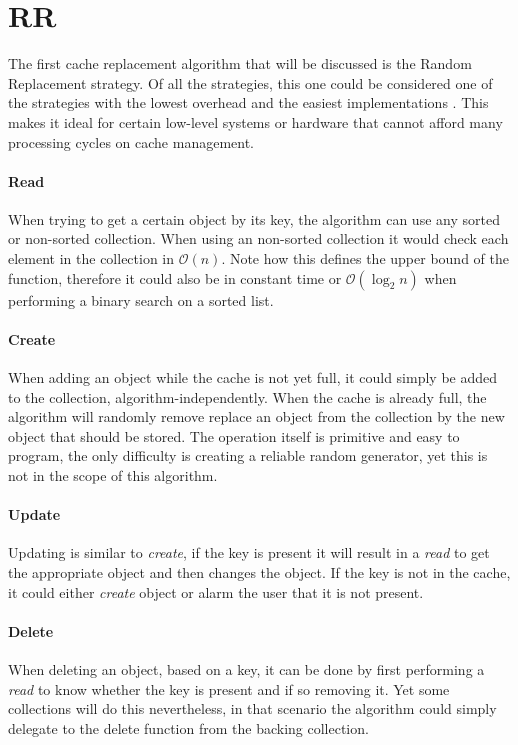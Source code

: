 \documentclass[pdftex,a4paper,12pt,twoside]{report}
\begin{document}
\section{RR}
The first cache replacement algorithm that will be discussed is the Random Replacement strategy. Of all the strategies, this one could be considered one of the strategies with the lowest overhead and the easiest implementations \citep{random_replacement}. This makes it ideal for certain low-level systems or hardware that cannot afford many processing cycles on cache management.
\paragraph{Read} When trying to get a certain object by its key, the algorithm can use any sorted or non-sorted collection. When using an non-sorted collection it would check each element in the collection in $\mathcal{O}(n)$. Note how this defines the upper bound of the function, therefore it could also be in constant time or $\mathcal{O}(\log_2n)$ when performing a binary search on a sorted list.
\paragraph{Create} When adding an object while the cache is not yet full, it could simply be added to the collection, algorithm-independently. When the cache is already full, the algorithm will randomly remove replace an object from the collection by the new object that should be stored. The operation itself is primitive and easy to program, the only difficulty is creating a reliable random generator, yet this is not in the scope of this algorithm.
\paragraph{Update} Updating is similar to \emph{create}, if the key is present it will result in a \emph{read} to get the appropriate object and then changes the object. If the key is not in the cache, it could either \emph{create} object or alarm the user that it is not present.
\paragraph{Delete} When deleting an object, based on a key, it can be done by first performing a \emph{read} to know whether the key is present and if so removing it. Yet some collections will do this nevertheless, in that scenario the algorithm could simply delegate to the delete function from the backing collection.
\end{document}
